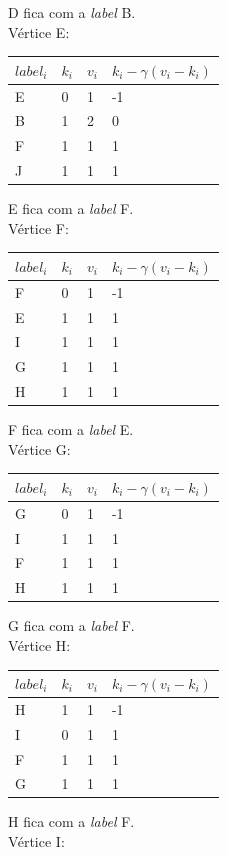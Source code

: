 \documentclass[a4paper,10pt]{report}
\begin{document}
  D fica com a \textit{label} B.
\\[0.25cm]
Vértice E:
  \begin{tabular}{| l | l | l | l |}
  \hline
  $label_i$ & $k_i$ & $v_i$ & $k_i - \gamma(v_i - k_i)$\\ \hline
  E & 0 & 1 & -1 \\ \hline
  B & 1 & 2 & 0  \\ \hline
  F & 1 & 1 & 1  \\ \hline
  J & 1 & 1 & 1  \\ \hline
  \end{tabular}  
  E fica com a \textit{label} F.
\\[0.25cm]
Vértice F:
  \begin{tabular}{| l | l | l | l |}
  \hline
  $label_i$ & $k_i$ & $v_i$ & $k_i - \gamma(v_i - k_i)$\\ \hline
  F & 0 & 1 & -1 \\ \hline
  E & 1 & 1 & 1  \\ \hline
  I & 1 & 1 & 1  \\ \hline
  G & 1 & 1 & 1  \\ \hline
  H & 1 & 1 & 1  \\ \hline
  \end{tabular}  
  F fica com a \textit{label} E.
\\[0.25cm]
Vértice G:
  \begin{tabular}{| l | l | l | l |}
  \hline
  $label_i$ & $k_i$ & $v_i$ & $k_i - \gamma(v_i - k_i)$\\ \hline
  G & 0 & 1 & -1 \\ \hline
  I & 1 & 1 & 1  \\ \hline
  F & 1 & 1 & 1  \\ \hline
  H & 1 & 1 & 1  \\ \hline
  \end{tabular}  
  G fica com a \textit{label} F.
\\[0.25cm]
Vértice H:
  \begin{tabular}{| l | l | l | l |}
  \hline
  $label_i$ & $k_i$ & $v_i$ & $k_i - \gamma(v_i - k_i)$\\ \hline
  H & 1 & 1 & -1  \\ \hline
  I & 0 & 1 & 1 \\ \hline
  F & 1 & 1 & 1  \\ \hline
  G & 1 & 1 & 1  \\ \hline
  \end{tabular}  
  H fica com a \textit{label} F.
\\[0.25cm]
Vértice I:
\end{document}
